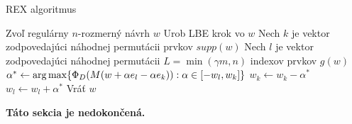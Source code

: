 \begin{algorithm}[H]
	\caption{REX algoritmus \cite{rex_harman}}
	\label{rex}
	\begin{algorithmic}[1]
		\State Zvoľ regulárny $n$-rozmerný návrh $w$
			\State Urob LBE krok vo $w$
			\State Nech $k$ je vektor zodpovedajúci náhodnej permutácii prvkov $supp(w)$
			\State Nech $l$ je vektor zodpovedajúci náhodnej permutácii $L=\min(\gamma m, n)$ indexov prvkov $g(w)$
					\State $\alpha^* \leftarrow \operatorname*{arg\,max} \{ \Phi_D (M(w+\alpha e_l -\alpha e_k)) : \alpha \in [-w_l, w_k] \}$
						\State $w_k \leftarrow w_k - \alpha^*$
						\State $w_l \leftarrow w_l + \alpha^*$
					\EndIf
				\EndFor
			\EndFor
		\EndWhile
		\State Vráť $w$
	\end{algorithmic}
\end{algorithm}

\textbf{Táto sekcia je nedokončená.}